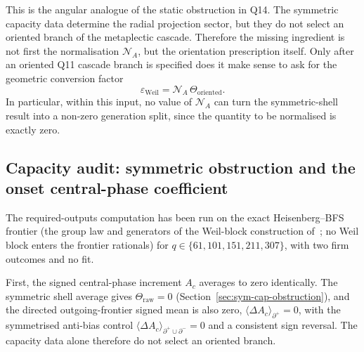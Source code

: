 \documentclass[11pt]{article}
\begin{document}
    This is the angular analogue of the static obstruction in Q14.
    The symmetric capacity data determine the radial projection sector, but they do not
    select an oriented branch of the metaplectic cascade.
    Therefore the missing ingredient is not first the normalisation
    $\mathcal{N}_A$, but the orientation prescription itself.
    Only after an oriented Q11 cascade branch is specified does it make sense to ask for the
    geometric conversion factor
    \[
      \varepsilon_{\mathrm{Weil}}
      =
      \mathcal{N}_A\,
      \Theta_{\mathrm{oriented}} .
    \]
    In particular, within this input, no value of $\mathcal{N}_A$ can turn the symmetric-shell result into a
    non-zero generation split, since the quantity to be normalised is exactly zero.

    \subsection{Capacity audit: symmetric obstruction and the onset central-phase coefficient}
      \label{subsec:capacity-audit}

      The required-outputs computation has been run on the exact Heisenberg--BFS frontier (the group law and
      generators of the Weil-block construction of~\cite{Beau2026a16}; no Weil block enters the frontier rationals)
      for $q\in\{61,101,151,211,307\}$, with two firm outcomes and no fit.

      First, the signed central-phase increment $A_c$ averages to zero identically.
      The symmetric shell average gives $\Theta_{\mathrm{raw}}=0$ (Section~\ref{sec:sym-cap-obstruction}), and the
      directed outgoing-frontier signed mean is also zero, $\langle\Delta A_c\rangle_{\partial^+}=0$, with the
      symmetrised anti-bias control $\langle\Delta A_c\rangle_{\partial^+\cup\partial^-}=0$ and a consistent sign
      reversal.
      The capacity data alone therefore do not select an oriented branch.
\end{document}
